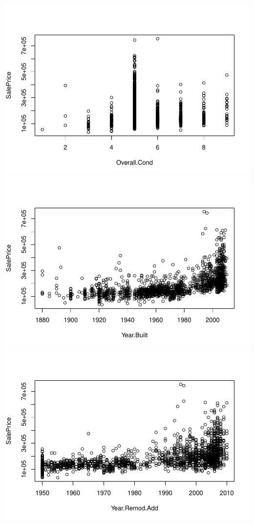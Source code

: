 \documentclass[
]{article}
\begin{document}
\includegraphics{Predicting-Housing-Price_files/figure-latex/unnamed-chunk-2-4.pdf}
\includegraphics{Predicting-Housing-Price_files/figure-latex/unnamed-chunk-2-5.pdf}
\includegraphics{Predicting-Housing-Price_files/figure-latex/unnamed-chunk-2-6.pdf}
\end{document}
